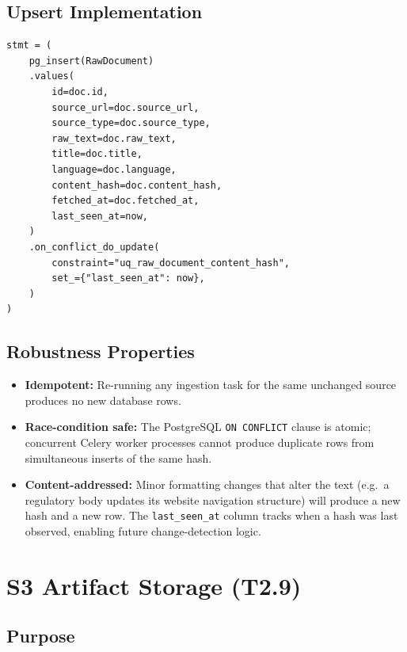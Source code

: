 \documentclass[12pt,a4paper]{article}
\begin{document}
\subsection{Upsert Implementation}

\begin{lstlisting}[caption={PostgreSQL upsert in storage.py}]
stmt = (
    pg_insert(RawDocument)
    .values(
        id=doc.id,
        source_url=doc.source_url,
        source_type=doc.source_type,
        raw_text=doc.raw_text,
        title=doc.title,
        language=doc.language,
        content_hash=doc.content_hash,
        fetched_at=doc.fetched_at,
        last_seen_at=now,
    )
    .on_conflict_do_update(
        constraint="uq_raw_document_content_hash",
        set_={"last_seen_at": now},
    )
)
\end{lstlisting}

\subsection{Robustness Properties}

\begin{itemize}[noitemsep]
  \item \textbf{Idempotent:} Re-running any ingestion task for the same unchanged source produces no new database rows.
  \item \textbf{Race-condition safe:} The PostgreSQL \texttt{ON CONFLICT} clause is atomic; concurrent Celery worker processes cannot produce duplicate rows from simultaneous inserts of the same hash.
  \item \textbf{Content-addressed:} Minor formatting changes that alter the text (e.g.\ a regulatory body updates its website navigation structure) will produce a new hash and a new row. The \texttt{last\_seen\_at} column tracks when a hash was last observed, enabling future change-detection logic.
\end{itemize}

\section{S3 Artifact Storage (T2.9)}

\subsection{Purpose}
\end{document}

